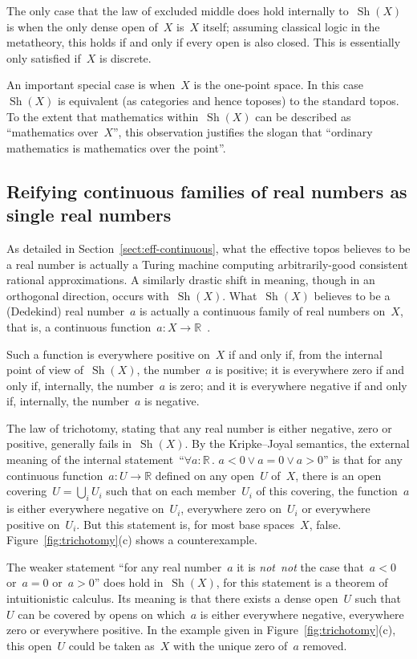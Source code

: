 \documentclass[graybox]{svmult}
\newcommand{\RR}{\mathbb{R}}
\DeclareMathOperator{\Sh}{Sh}
\renewcommand{\_}{\mathpunct{.}\,}
\newcommand{\effective}{ef{}fective\xspace}
\newcommand{\?}{\,{:}\,}
\newcommand{\notnot}{\emph{not~not}\xspace}
\begin{document}
The only case that the law of excluded middle does hold internally to~$\Sh(X)$
is when the only dense open of~$X$ is~$X$ itself; assuming classical logic in
the metatheory, this holds if and only if every open is also closed. This is
essentially only satisfied if~$X$ is discrete.

An important special case is when~$X$ is the one-point space. In this
case~$\Sh(X)$ is equivalent (as categories and hence toposes) to the standard
topos. To the extent that mathematics within~$\Sh(X)$ can be described as ``mathematics
over~$X$'', this observation justifies the slogan that ``ordinary mathematics
is mathematics over the point''.


\subsection{Reifying continuous families of real numbers as single real numbers}
As detailed in Section~\ref{sect:eff-continuous}, what the \effective topos believes to be a real number is
actually a Turing machine computing arbitrarily-good consistent rational
approximations. A similarly drastic shift in meaning, though in an orthogonal
direction, occurs with~$\Sh(X)$. What~$\Sh(X)$ believes to be a (Dedekind) real
number~$a$ is actually a continuous family of real numbers on~$X$, that is, a
continuous function~$a : X \to \RR$~\cite[Corollary~D4.7.5]{johnstone:elephant}.

Such a function is everywhere positive on~$X$ if and only if, from the internal point of
view of~$\Sh(X)$, the number~$a$ is positive; it is everywhere zero if and only
if, internally, the number~$a$ is zero; and it is everywhere negative if and
only if, internally, the number~$a$ is negative.

The law of trichotomy, stating that any real number is either negative, zero or
positive, generally fails in~$\Sh(X)$. By the Kripke--Joyal semantics, the external
meaning of the internal statement~``$\forall a:\RR\_ a<0 \vee a=0 \vee a>0$'' is that for any continuous function~$a : U
\to \RR$ defined on any open~$U$ of~$X$, there is an open covering~$U =
\bigcup_i U_i$ such that on each member~$U_i$ of this covering, the function~$a$ is
either everywhere negative on~$U_i$, everywhere zero on~$U_i$ or everywhere
positive on~$U_i$. But this statement is, for most base spaces~$X$, false.
Figure~\ref{fig:trichotomy}(c) shows a counterexample.

The weaker statement ``for any real number~$a$ it is \notnot the case that~$a < 0$
or~$a = 0$ or~$a > 0$'' does hold in~$\Sh(X)$, for this statement is a
theorem of intuitionistic calculus. Its meaning is that there exists a
dense open~$U$ such that~$U$ can be covered by opens on which~$a$ is either
everywhere negative, everywhere zero or everywhere positive. In the example
given in Figure~\ref{fig:trichotomy}(c), this open~$U$ could be taken as~$X$
with the unique zero of~$a$ removed.
\end{document}
